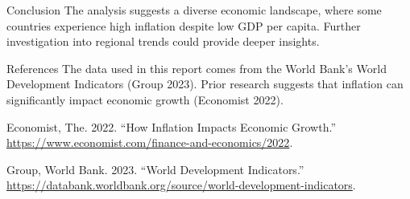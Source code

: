 \documentclass[
  letterpaper,
  DIV=11,
  numbers=noendperiod]{scrartcl}
\newlength{\cslhangindent}
\newenvironment{CSLReferences}[2] %
 {\begin{list}{}{%
  \setlength{\itemindent}{0pt}
  \setlength{\leftmargin}{0pt}
  \setlength{\parsep}{0pt}
  \ifodd #1
   \setlength{\leftmargin}{\cslhangindent}
   \setlength{\itemindent}{-1\cslhangindent}
  \fi
  \setlength{\itemsep}{#2\baselineskip}}}
 {\end{list}}
\begin{document}
Conclusion The analysis suggests a diverse economic landscape, where
some countries experience high inflation despite low GDP per capita.
Further investigation into regional trends could provide deeper
insights.

References The data used in this report comes from the World Bank's
World Development Indicators (Group 2023). Prior research suggests that
inflation can significantly impact economic growth (Economist 2022).

\label{refs}
\begin{CSLReferences}{1}{0}
Economist, The. 2022. {``How Inflation Impacts Economic Growth.''}
\url{https://www.economist.com/finance-and-economics/2022}.

Group, World Bank. 2023. {``World Development Indicators.''}
\url{https://databank.worldbank.org/source/world-development-indicators}.

\end{CSLReferences}
\end{document}
